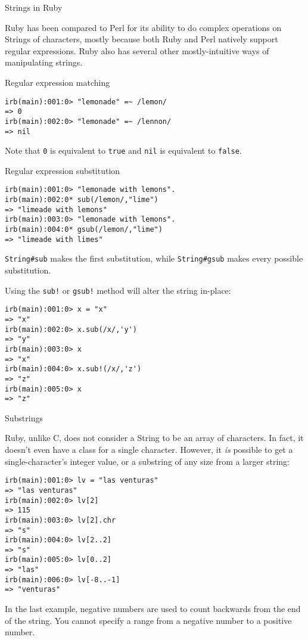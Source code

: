 \documentclass{slides}
\newcommand{\sh}[1]{
	{\Large #1}
	
}
\newcommand{\subh}[1]{
	{\large #1}
	
}
\begin{document}
\begin{slide}
\sh{Strings in Ruby}
Ruby has been compared to Perl for its ability to do complex operations on Strings of characters, mostly because both Ruby and Perl natively support regular expressions.  Ruby also has several other mostly-intuitive ways of manipulating strings.

\subh{Regular expression matching}
\begin{verbatim}
irb(main):001:0> "lemonade" =~ /lemon/
=> 0
irb(main):002:0> "lemonade" =~ /lennon/
=> nil
\end{verbatim}
Note that \verb|0| is equivalent to \verb|true| and \verb|nil| is equivalent to \verb|false|.
\end{slide}

\begin{slide}
\subh{Regular expression substitution}
\begin{verbatim}
irb(main):001:0> "lemonade with lemons".
irb(main):002:0* sub(/lemon/,"lime")
=> "limeade with lemons"
irb(main):003:0> "lemonade with lemons".
irb(main):004:0* gsub(/lemon/,"lime")
=> "limeade with limes"
\end{verbatim}
\verb|String#sub| makes the first substitution, while \verb|String#gsub| makes every possible substitution.

Using the \verb|sub!| or \verb|gsub!| method will alter the string in-place:
\begin{verbatim}
irb(main):001:0> x = "x"
=> "x"
irb(main):002:0> x.sub(/x/,'y')
=> "y"
irb(main):003:0> x
=> "x"
irb(main):004:0> x.sub!(/x/,'z')
=> "z"
irb(main):005:0> x
=> "z"
\end{verbatim}
\end{slide}

\begin{slide}
\subh{Substrings}
Ruby, unlike C, does not consider a String to be an array of characters.  In fact, it doesn't even have a class for a single character.  However, it {\em is} possible to get a single-character's integer value, or a substring of any size from a larger string:
\begin{verbatim}
irb(main):001:0> lv = "las venturas"
=> "las venturas"
irb(main):002:0> lv[2]
=> 115
irb(main):003:0> lv[2].chr
=> "s"
irb(main):004:0> lv[2..2]
=> "s"
irb(main):005:0> lv[0..2]
=> "las"
irb(main):006:0> lv[-8..-1]
=> "venturas"
\end{verbatim}
In the last example, negative numbers are used to count backwards from the end of the string.  You cannot specify a range from a negative number to a positive number.
\end{slide}
\end{document}
